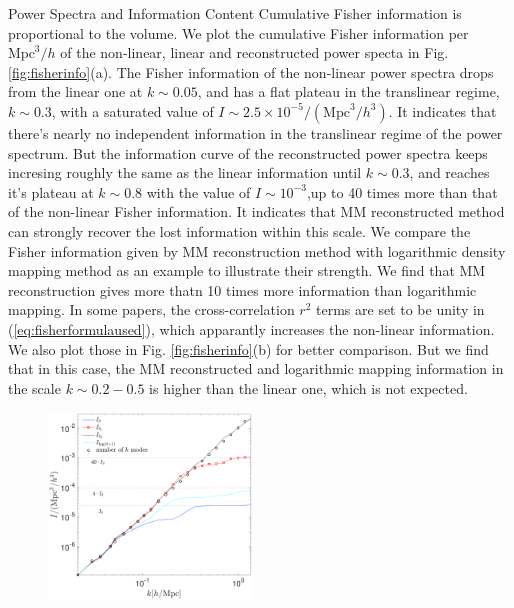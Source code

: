 \begin{section}{Power Spectra and Information Content}
  Cumulative Fisher information is proportional to the volume. We plot the 
cumulative Fisher information per $\mathrm{Mpc}^3/h$ of the non-linear, linear and reconstructed power specta in 
Fig.\ref{fig:fisherinfo}(a). The Fisher information of the non-linear power spectra drops 
from the linear one at $k \sim 0.05$, and has a flat plateau in the translinear regime, $k\sim0.3$, with 
a saturated value of $I \sim 2.5 \times 10^{-5}/(\mathrm{Mpc}^3/h^3)$. It 
indicates that there's nearly no independent information in the translinear regime of the power 
spectrum.
But the information curve of 
the reconstructed power spectra keeps incresing roughly the same as 
the linear information until $k\sim0.3$, and reaches it's plateau at $k\sim0.8$ with the 
value of $I \sim 10^{-3}$,up to 40 times more than that of the non-linear Fisher information. 
It indicates that MM reconstructed method can strongly recover the lost information 
within this scale. We compare the Fisher information given by MM reconstruction method with 
logarithmic density mapping method \cite{bib:Mark2009} as an example to illustrate their strength. 
We find that MM reconstruction gives more thatn 10 times more information than logarithmic mapping. 
In some papers, the cross-correlation $r^2$ terms are set to be unity in (\ref{eq:fisherformulaused}), which 
apparantly increases the non-linear information. We also plot those in Fig. \ref{fig:fisherinfo}(b) 
for better comparison. But we find that in this case, the MM reconstructed and logarithmic mapping information in the scale 
$k \sim 0.2 - 0.5$ is higher than the linear one, which is not expected. 
\begin{figure}
  \includegraphics[width=0.48\textwidth]{fisher_r2_best_analysis-crop.pdf}

\end{figure}
\end{section}
